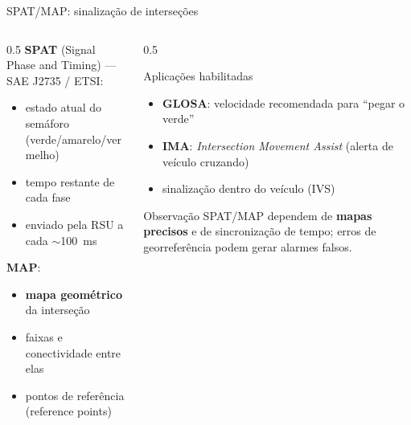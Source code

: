 \documentclass[aspectratio=169,11pt]{beamer}
\begin{document}
\begin{frame}{SPAT/MAP: sinalização de interseções}
  \begin{columns}
    \begin{column}{0.5\textwidth}
      \textbf{SPAT} (Signal Phase and Timing) --- SAE J2735 / ETSI:
      \begin{itemize}
        \item estado atual do semáforo (verde/amarelo/vermelho)
        \item tempo restante de cada fase
        \item enviado pela RSU a cada $\sim$100~ms
      \end{itemize}
      \textbf{MAP}:
      \begin{itemize}
        \item \textbf{mapa geométrico} da interseção
        \item faixas e conectividade entre elas
        \item pontos de referência (reference points)
      \end{itemize}
    \end{column}
    \begin{column}{0.5\textwidth}
      \begin{block}{Aplicações habilitadas}
        \begin{itemize}
          \item \textbf{GLOSA}: velocidade recomendada para ``pegar o verde''
          \item \textbf{IMA}: \emph{Intersection Movement Assist} (alerta de veículo cruzando)
          \item sinalização dentro do veículo (IVS)
        \end{itemize}
      \end{block}
      \begin{alertblock}{Observação}
        SPAT/MAP dependem de \textbf{mapas precisos} e de sincronização de tempo; erros de georreferência podem gerar alarmes falsos.
      \end{alertblock}
    \end{column}
  \end{columns}
\end{frame}
\end{document}
